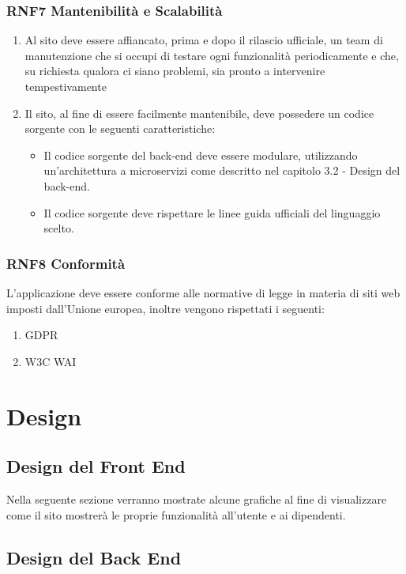 \documentclass{report}
\begin{document}
\subsection*{RNF7 Mantenibilità e Scalabilità}
\begin{enumerate}
	\item Al sito deve essere affiancato, prima e dopo il rilascio ufficiale, un team di manutenzione che si occupi di testare ogni funzionalità periodicamente e che, su richiesta qualora ci siano problemi, sia pronto a intervenire tempestivamente
	\item Il sito, al fine di essere facilmente mantenibile, deve possedere un codice sorgente con le seguenti caratteristiche:
	\begin{itemize}
		\item Il codice sorgente del back-end deve essere modulare, utilizzando un'architettura a microservizi come descritto nel capitolo 3.2 - Design del back-end.
		\item Il codice sorgente deve rispettare le linee guida ufficiali del linguaggio scelto.
	
	\end{itemize} 
\end{enumerate}
\subsection*{RNF8 Conformità}
L'applicazione deve essere conforme alle normative di legge in materia di siti web imposti dall'Unione europea, inoltre vengono rispettati i seguenti:
\begin{enumerate}
	\item GDPR
	\item W3C WAI
\end{enumerate}
\chapter{Design}

\section{Design del Front End}

Nella seguente sezione verranno mostrate alcune grafiche al fine di visualizzare come il sito mostrerà le proprie funzionalità all’utente e ai dipendenti.


\section{Design del Back End}
\end{document}
